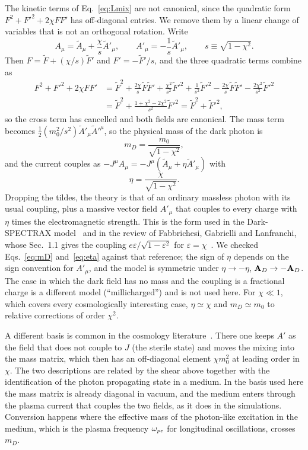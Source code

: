 The kinetic terms of Eq.~\eqref{eq:Lmix} are not canonical, since the quadratic form $F^2+F'^2+2\chi FF'$ has off-diagonal entries. We remove them by a linear change of variables that is not an orthogonal rotation. Write
\begin{equation}
A_\mu=\tilde A_\mu+\frac{\chi}{s}\tilde A'_\mu,\qquad A'_\mu=-\frac{1}{s}\tilde A'_\mu,\qquad s\equiv\sqrt{1-\chi^2}.
\end{equation}
Then $F=\tilde F+(\chi/s)\tilde F'$ and $F'=-\tilde F'/s$, and the three quadratic terms combine as
\begin{align}
F^2+F'^2+2\chi FF'&=\tilde F^2+\frac{2\chi}{s}\tilde F\tilde F'+\frac{\chi^2}{s^2}\tilde F'^2+\frac{1}{s^2}\tilde F'^2-\frac{2\chi}{s}\tilde F\tilde F'-\frac{2\chi^2}{s^2}\tilde F'^2\nonumber\\
&=\tilde F^2+\frac{1+\chi^2-2\chi^2}{s^2}\tilde F'^2=\tilde F^2+\tilde F'^2 ,
\end{align}
so the cross term has cancelled and both fields are canonical. The mass term becomes $\tfrac12(m_0^2/s^2)\tilde A'_\mu\tilde A'^\mu$, so the physical mass of the dark photon is
\begin{equation}
m_D=\frac{m_0}{\sqrt{1-\chi^2}} ,\label{eq:mD}
\end{equation}
and the current couples as $-J^\mu A_\mu=-J^\mu(\tilde A_\mu+\eta\tilde A'_\mu)$ with
\begin{equation}
\eta=\frac{\chi}{\sqrt{1-\chi^2}} .\label{eq:eta}
\end{equation}
Dropping the tildes, the theory is that of an ordinary massless photon with its usual coupling, plus a massive vector field $A'_\mu$ that couples to every charge with $\eta$ times the electromagnetic strength. This is the form used in the Dark-SPECTRAX model~\citep{DarkSPECTRAX} and in the review of Fabbrichesi, Gabrielli and Lanfranchi, whose Sec.~1.1 gives the coupling $e\varepsilon/\sqrt{1-\varepsilon^2}$ for $\varepsilon=\chi$~\citep{Fabbrichesi2020}. We checked Eqs.~\eqref{eq:mD} and~\eqref{eq:eta} against that reference; the sign of $\eta$ depends on the sign convention for $A'_\mu$, and the model is symmetric under $\eta\to-\eta$, $\mathbf A_D\to-\mathbf A_D$. The case in which the dark field has no mass and the coupling is a fractional charge is a different model (``millicharged'') and is not used here. For $\chi\ll1$, which covers every cosmologically interesting case, $\eta\simeq\chi$ and $m_D\simeq m_0$ to relative corrections of order $\chi^2$.

A different basis is common in the cosmology literature~\citep{Mirizzi2009,Redondo2009,Arias2012}. There one keeps $A'$ as the field that does not couple to $J$ (the sterile state) and moves the mixing into the mass matrix, which then has an off-diagonal element $\chi m_0^2$ at leading order in $\chi$. The two descriptions are related by the shear above together with the identification of the photon propagating state in a medium. In the basis used here the mass matrix is already diagonal in vacuum, and the medium enters through the plasma current that couples the two fields, as it does in the simulations. Conversion happens where the effective mass of the photon-like excitation in the medium, which is the plasma frequency $\omega_{pe}$ for longitudinal oscillations, crosses $m_D$.

